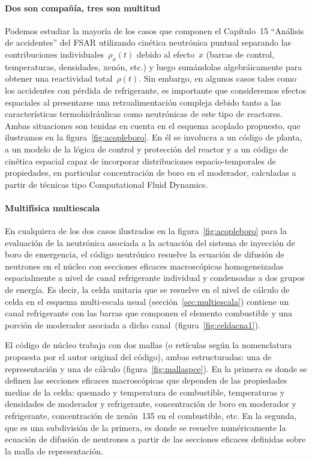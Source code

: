\paragraph{Dos son compañía, tres son multitud}
Podemos estudiar la mayoría de los casos que componen el Capítulo~15 ``Análisis de accidentes'' del FSAR utilizando cinética neutrónica puntual separando las contribuciones individuales~$\rho_x(t)$ debido al efecto~$x$ (barras de control, temperaturas, densidades, xenón, etc.) y luego sumándolas algebráicamente  para obtener una reactividad total~$\rho(t)$. Sin embargo, en algunos casos tales como los accidentes con pérdida de refrigerante, es importante que consideremos efectos espaciales al presentarse una retroalimentación compleja debido tanto a las características termohidráulicas como neutrónicas de este tipo de reactores. Ambas situaciones son tenidas en cuenta en el esquema acoplado propuesto, que ilustramos en la figura~\ref{fig:acopleboro}. En él se involucra a un código de planta, a un modelo de la lógica de control y protección del reactor y a un código de cinética espacial capaz de incorporar distribuciones espacio-temporales de propiedades, en particular concentración de boro en el moderador, 
calculadas a partir de técnicas tipo Computational Fluid Dynamics. 


\paragraph{Multifísica multiescala}
En cualquiera de los dos casos ilustrados en la figura~\ref{fig:acopleboro} para la evaluación de la neutrónica asociada a la actuación del sistema de inyección de boro de emergencia, el código neutrónico resuelve la ecuación de difusión de neutrones en el núcleo con secciones eficaces macroscópicas homogeneizadas espacialmente a nivel de canal refrigerante individual y condensadas a dos grupos de energía. Es decir, la celda unitaria que se resuelve en el nivel de cálculo de celda en el esquema multi-escala usual (sección~\ref{sec:multiescala}) contiene un canal refrigerante con las barras que componen el elemento combustible y una porción de moderador asociada a dicho canal~(figura~\ref{fig:celdacna1}).

\medskip

El código de núcleo trabaja con dos mallas (o retículas según la nomenclatura propuesta por el autor original del código), ambas estructuradas: una de representación y una de cálculo (figura~\ref{fig:mallaspce}). En la primera es donde se definen las secciones eficaces macroscópicas que dependen de las propiedades medias de la celda: quemado y temperatura de combustible, temperaturas y densidades de moderador y refrigerante, concentración de boro en moderador y refrigerante, concentración de xenón~135 en el combustible, etc. En la segunda, que es una subdivisión de la primera, es donde se resuelve numéricamente la ecuación de difusión de neutrones a partir de las secciones eficaces definidas sobre la malla de representación.

